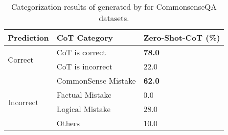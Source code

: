 \begin{table}[h]
\centering
\captionsetup{width=0.65\textwidth}
\caption{Categorization results of generated \CoT by \ours for CommonsenseQA datasets.}
\label{tab:analysis_commonsenseqa}
\begin{tabular}{lll}\toprule
Prediction &CoT Category &Zero-Shot-CoT (\%) \\\midrule \midrule
\multirow{2}{*}{Correct} &CoT is correct &\textbf{78.0} \\
&CoT is incorrect &22.0 \\

\midrule

\multirow{4}{*}{Incorrect} &CommonSense Mistake &\textbf{62.0} \\
&Factual Mistake &0.0 \\
&Logical Mistake &28.0 \\
&Others &10.0 \\
\bottomrule
\end{tabular}
\end{table}